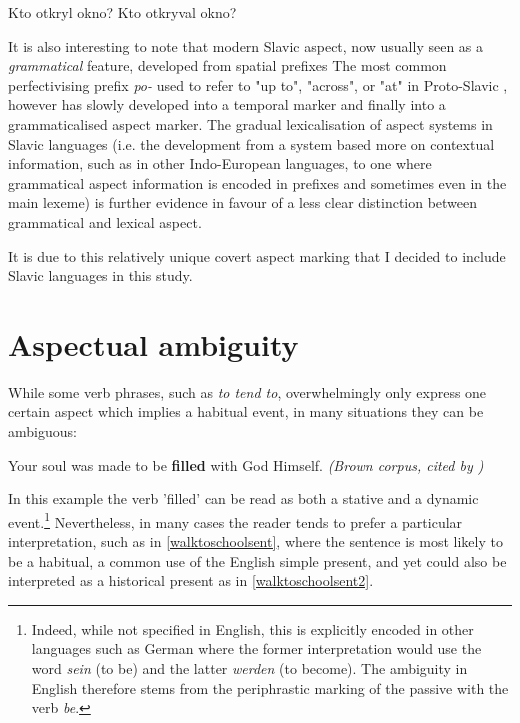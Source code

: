 \begin{exe}
    \ex Kto otkryl okno?
    \label{oknoperf}
    \ex Kto otkryval okno?
    \label{oknoimp}
\end{exe}

It is also interesting to note that modern Slavic aspect, now usually seen as a \emph{grammatical} feature, developed from spatial prefixes \citep{prefixation_in_rise_of_slav_asp} The most common perfectivising prefix \emph{po-} used to refer to "up to", "across", or "at" in Proto-Slavic \citep{Derksen2008EtymologicalDO}, however has slowly developed into a temporal marker and finally into a grammaticalised aspect marker. The gradual lexicalisation of aspect systems in Slavic languages (i.e. the development from a system based more on contextual information, such as in other Indo-European languages, to one where grammatical aspect information is encoded in prefixes and sometimes even in the main lexeme) is further evidence in favour of a less clear distinction between grammatical and lexical aspect.

It is due to this relatively unique covert aspect marking that I decided to include Slavic languages in this study.

\section{Aspectual ambiguity}
While some verb phrases, such as \emph{to tend to}, overwhelmingly only express one certain aspect which implies a habitual event, in many situations they can be ambiguous:
\begin{exe}
    \ex Your soul was made to be \textbf{filled} with God Himself. \emph{(Brown corpus, cited by \citet{Friedrich2014AutomaticPO})}
\end{exe}
In this example the verb 'filled' can be read as both a stative and a dynamic event.\footnote{Indeed, while not specified in English, this is explicitly encoded in other languages such as German where the former interpretation would use the word \emph{sein} (to be) and the latter \emph{werden} (to become). The ambiguity in English therefore stems from the periphrastic marking of the passive with the verb \emph{be}.} Nevertheless, in many cases the reader tends to prefer a particular interpretation, such as in \ref{walktoschoolsent}, where the sentence is most likely to be a habitual, a common use of the English simple present, and yet could also be interpreted as a historical present as in \ref{walktoschoolsent2}.


